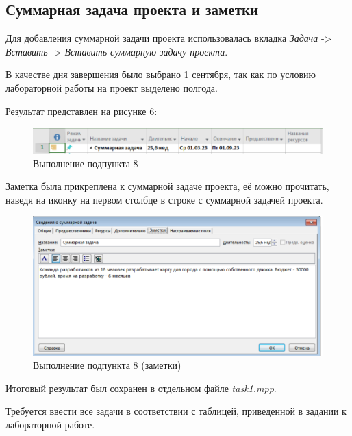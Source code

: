 \subsection*{Суммарная задача проекта и заметки}
Для добавления суммарной задачи проекта использовалась вкладка \textit{Задача} -> \textit{Вставить} -> \textit{Вставить суммарную задачу проекта}.

В качестве дня завершения было выбрано 1 сентября, так как по условию лабораторной работы на проект выделено полгода.

Результат представлен на рисунке 6:
\FloatBarrier
\begin{figure}[h]	
	\begin{center}
		\includegraphics[width=\linewidth]{inc/1-81.png}
	\end{center}
	\captionsetup{justification=centering}
	\caption{Выполнение подпункта 8}
\end{figure}
\FloatBarrier

Заметка была прикреплена к суммарной задаче проекта, её можно прочитать, наведя на иконку на первом столбце в строке с суммарной задачей проекта.
\FloatBarrier
\begin{figure}[h]	
	\begin{center}
		\includegraphics[width=\linewidth]{inc/1-82.png}
	\end{center}
	\captionsetup{justification=centering}
	\caption{Выполнение подпункта 8 (заметки)}
\end{figure}
\FloatBarrier

Итоговый результат был сохранен в отдельном файле \textit{task1.mpp}.

Требуется ввести все задачи в соответствии с таблицей, приведенной в задании к лабораторной работе.

